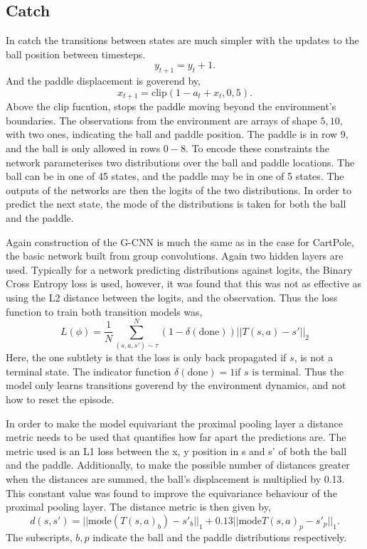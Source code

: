 \subsection{Catch}
In catch the transitions between states are much simpler with the updates to the ball position between timesteps.
\begin{equation}
	y_{t+1} = y_t + 1.
\end{equation}
And the paddle displacement is goverend by,
\begin{equation}
	x_{t+1} = \text{clip}(1- a_t + x_t, 0, 5).
\end{equation}
Above the clip fucntion, stops the paddle moving beyond the environment's boundaries. The observations from the environment are arrays of shape $5 , 10$, with two ones, indicating the ball and paddle position. The paddle is in row 9, and the ball is only allowed in rows $0 -8$. To encode these constraints the network parameterises two distributions over the ball and paddle locations. The ball can be in one of 45 states, and the paddle may be in one of 5 states. The outputs of the networks are then the logits of the two distributions. In order to predict the next state, the mode of the distributions is taken for both the ball and the paddle. 

Again construction of the G-CNN is much the same as in the case for CartPole, the basic network built from group convolutions. Again two hidden layers are used. Typically for a network predicting distributions against logits, the Binary Cross Entropy loss is used, however, it was found that this was not as effective as using the L2 distance between the logits, and the observation. Thus the loss function to train both transition models was,
\begin{equation}
	L(\phi) = \frac{1}{N}\sum_{(s, a, s') \sim \tau}^N (1 - \delta(\text{done}))||T(s, a) - s'||_2 \end{equation} Here, the one subtlety is that the loss is only back propagated if $s$, is not a terminal state. The indicator function $\delta(\text{done}) = 1 \text{if $s$ is terminal} $. Thus the model only learns transitions goverend by the environment dynamics, and not how to reset the episode.

In order to make the model equivariant the proximal pooling layer a distance metric needs to be used that quantifies how far apart the predictions are. The metric used is an L1 loss between the x, y position in s and s' of both the ball and the paddle. Additionally, to make the possible number of distances greater when the distances are summed, the ball's displacement is multiplied by 0.13. This constant value was found to improve the equivariance behaviour of the proximal pooling layer. The distance metric is then given by,
\begin{equation}
	d(s, s') = ||\text{mode}(T(s, a)_b) - s'_b||_1 + 0.13 ||\text{mode}T(s, a)_p - s'_p||_1.
\end{equation}
The subscripts, $b, p$ indicate the ball and the paddle distributions respectively.

